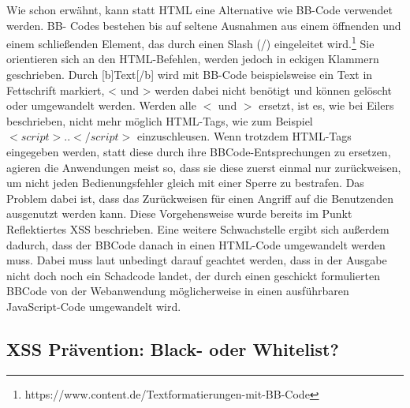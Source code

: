 Wie schon erwähnt, kann statt HTML eine Alternative wie BB-Code verwendet werden. BB- Codes bestehen bis auf seltene Ausnahmen aus einem öffnenden und einem schließenden Element, das durch einen Slash (/) eingeleitet wird.\footnote{https://www.content.de/Textformatierungen-mit-BB-Code} Sie orientieren sich an den HTML-Befehlen, werden jedoch in eckigen Klammern geschrieben. Durch [b]Text[/b] wird mit BB-Code beispielsweise ein Text in Fettschrift markiert,  < und > werden dabei nicht benötigt und können gelöscht oder umgewandelt werden.
Werden alle $<$ und $>$ ersetzt, ist es, wie bei Eilers beschrieben, nicht mehr möglich HTML-Tags, wie zum Beispiel $<script>..</script>$  einzuschleusen. Wenn trotzdem HTML-Tags eingegeben werden, statt diese durch ihre BBCode-Entsprechungen zu ersetzen, agieren die Anwendungen meist so, dass sie diese zuerst einmal nur zurückweisen, um nicht jeden Bedienungsfehler gleich mit einer Sperre zu bestrafen. Das Problem dabei ist, dass das Zurückweisen für einen Angriff auf die Benutzenden ausgenutzt werden kann. Diese Vorgehensweise wurde bereits im Punkt Reflektiertes XSS beschrieben. Eine weitere Schwachstelle ergibt sich außerdem dadurch, dass der BBCode danach in einen HTML-Code umgewandelt werden muss. Dabei muss laut \textcite{eilers2015} unbedingt darauf geachtet werden, dass in der Ausgabe nicht doch noch ein Schadcode landet, der durch einen geschickt formulierten BBCode von der Webanwendung möglicherweise in einen ausführbaren JavaScript-Code umgewandelt wird.

\subsection{XSS Prävention: Black- oder Whitelist?}
\label{subsection:prevention_black_or_whitelists}

